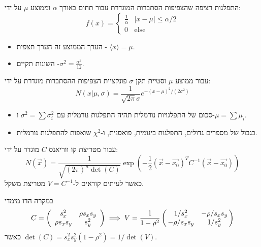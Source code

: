 \documentclass{tstextbook}
\begin{document}
\begin{definition}
התפלגות רציפה שהצפיפות הסתברות המוגדרת עבור תחום באורך \(\alpha\) וממוצע \(\mu\) על ידי:
$$f(x)=\begin{cases}\frac{1}{\alpha} & \left\lvert  x-\mu  \right\rvert \leq \alpha / 2 \\0 & \text{else}
\end{cases}$$

\end{definition}
\begin{proposition}
  \begin{itemize}
    \item הערך הממוצע זה הערך תצפית - \(\langle x \rangle=\mu\).
    \item השונות תקיים -\(\sigma^{2}=\frac{\alpha^{2}}{12}\).
  \end{itemize}
\end{proposition}
\begin{definition}
עבור ממוצע \(\mu\) וסטיית תקן \(\sigma\) פונקציית הצפיפות ההסתברות מוגדרת על ידי:
$$N(x|\mu,\sigma)=\frac{1}{\sqrt{2\pi}\sigma}e^{-(x-\mu)^{2}/(2\sigma^{2})}$$

\end{definition}
\begin{proposition}
  \begin{itemize}
    \item סכום של התפלגויות נורמלית תהיה התפלגות נורמלית עם \(\sigma^{2}=\sum\sigma_{i}^{2}\) ו-\(\mu=\sum\mu_{i}\).
    \item בגבול של מספרים גדולים, התפלגות בינומית, פואסנית, ו-\(\chi^{2}\) שואפות להתפלגות נורמלית.
  \end{itemize}
\end{proposition}
\begin{definition}
עבור מטריצת קו ווריאנס \(C\) מוגדר על ידי:
$$N(\vec{x})=\frac{1}{\sqrt{(2\pi)^{n}\det(C)}}\exp\left(-\frac{1}{2}(\vec{x}-\vec{x_{0}})^{T}C^{-1}(\vec{x}-\vec{x_{0}})\right)$$
כאשר לעיתים קוראים ל-\(V=C^{-1}\) מטריצת משקל.

\end{definition}
\begin{example}
במקרה הדו מימדי
$$C=\left(\begin{array}{c c}{{s_{x}^{2}}}&{{\rho s_{x}s_{y}}}\\ {{\rho s_{x}s_{y}}}&{{s_{y}^{2}}}\end{array}\right)\implies V=\frac{1}{1-\rho^{2}}\left(\!\!\begin{array}{c c}{{1/s_{x}^{2}}}&{{-\rho/s_{x}s_{y}}}\\ {{-\rho/s_{x}s_{y}}}&{{1/s_{y}^{2}}}\end{array}\!\!\right)$$
כאשר \(\det(C)=s_{x}^{2}s_{y}^{2}\left( 1-\rho^{2} \right)=1/\det(V)\).

\end{example}
\end{document}
